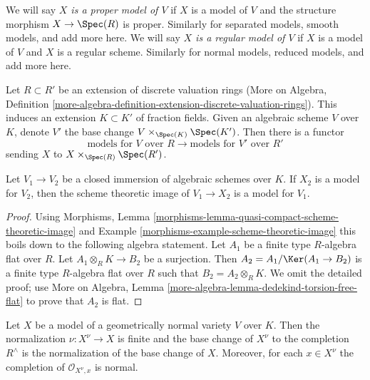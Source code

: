 \medskip\noindent
We will say {\it $X$ is a proper model of $V$} if $X$ is a model
of $V$ and the structure morphism $X \to \Spec(R)$ is proper.
Similarly for separated models, smooth models, and add more here.
We will say {\it $X$ is a regular model of $V$} if $X$ is a model
of $V$ and $X$ is a regular scheme.
Similarly for normal models, reduced models, and add more here.

\medskip\noindent
Let $R \subset R'$ be an extension of discrete valuation rings
(More on Algebra, Definition
\ref{more-algebra-definition-extension-discrete-valuation-rings}).
This induces an extension $K \subset K'$ of fraction fields.
Given an algebraic scheme $V$ over $K$, denote $V'$ the
base change $V \times_{\Spec(K)} \Spec(K')$. Then there is
a functor
$$
\text{models for }V\text{ over }R
\longrightarrow
\text{models for }V'\text{ over }R'
$$
sending $X$ to $X \times_{\Spec(R)} \Spec(R')$.

\begin{lemma}
\label{lemma-closure-is-model}
Let $V_1 \to V_2$ be a closed immersion of algebraic schemes over $K$.
If $X_2$ is a model for $V_2$, then the scheme theoretic image
of $V_1 \to X_2$ is a model for $V_1$.
\end{lemma}

\begin{proof}
Using
Morphisms, Lemma \ref{morphisms-lemma-quasi-compact-scheme-theoretic-image} and
Example \ref{morphisms-example-scheme-theoretic-image}
this boils down to the following algebra statement.
Let $A_1$ be a finite type $R$-algebra flat over $R$.
Let $A_1 \otimes_R K \to B_2$ be a surjection. Then
$A_2 = A_1 / \Ker(A_1 \to B_2)$ is a finite type $R$-algebra
flat over $R$ such that $B_2 = A_2 \otimes_R K$.
We omit the detailed proof; use
More on Algebra, Lemma \ref{more-algebra-lemma-dedekind-torsion-free-flat}
to prove that $A_2$ is flat.
\end{proof}

\begin{lemma}
\label{lemma-normalization}
Let $X$ be a model of a geometrically normal variety $V$ over $K$.
Then the normalization $\nu : X^\nu \to X$ is finite and
the base change of $X^\nu$ to the completion $R^\wedge$
is the normalization of the base change of $X$. Moreover, for
each $x \in X^\nu$ the completion of $\mathcal{O}_{X^\nu, x}$
is normal.
\end{lemma}

